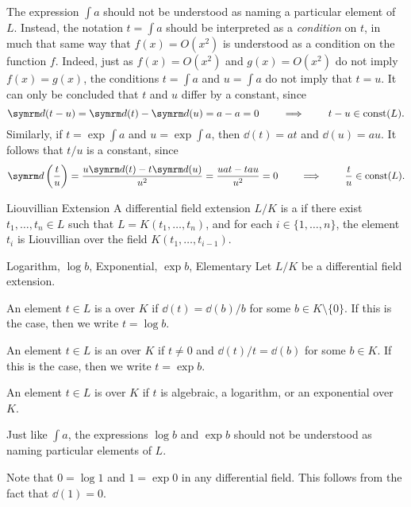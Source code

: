 The expression $\int a$ should not be understood as naming a particular element of $L$. Instead, the notation $t = \int a$ should be interpreted as a \textit{condition} on $t$, in much that same way that $f(x) = O(x^2)$ is understood as a condition on the function $f$. Indeed, just as $f(x) = O(x^2)$ and $g(x) = O(x^2)$ do not imply $f(x) = g(x)$, the conditions $t = \int a$ and $u = \int a$ do not imply that $t = u$. It can only be concluded that $t$ and $u$ differ by a constant, since
\[ \dd(t - u) = \dd(t) - \dd(u) = a - a = 0 \qquad\implies\qquad t - u \in \const(L). \]
Similarly, if $t = \exp \int a$ and $u = \exp \int a$, then $\dd(t) = at$ and $\dd(u) = au$. It follows that $t/u$ is a constant, since
\[ \dd\left( \frac{t}{u} \right) = \frac{u \dd(t) - t \dd(u)}{u^2} = \frac{uat - tau}{u^2} = 0 \qquad\implies\qquad \frac{t}{u} \in \const(L). \]

\begin{dfnbox}{Liouvillian Extension}
	A differential field extension $L/K$ is a  if there exist $t_1, \dots, t_n \in L$ such that $L = K(t_1, \dots, t_n)$, and for each $i \in \{1, \dots, n\}$, the element $t_i$ is Liouvillian over the field $K(t_1, \dots, t_{i-1})$.
\end{dfnbox}

\begin{dfnbox}{Logarithm, $\log b$, Exponential, $\exp b$, Elementary}
	Let $L/K$ be a differential field extension.
	\begin{dfnitems}
		\item An element $t \in L$ is a  over $K$ if $\dd(t) = \dd(b) / b$ for some $b \in K \setminus \{0\}$. If this is the case, then we write $t = \log b$.
		\item An element $t \in L$ is an  over $K$ if $t \ne 0$ and $\dd(t)/t = \dd(b)$ for some $b \in K$. If this is the case, then we write $t = \exp b$.
		\item An element $t \in L$ is  over $K$ if $t$ is algebraic, a logarithm, or an exponential over $K$.
	\end{dfnitems}
\end{dfnbox}

Just like $\int a$, the expressions $\log b$ and $\exp b$ should not be understood as naming particular elements of $L$.

Note that $0 = \log 1$ and $1 = \exp 0$ in any differential field. This follows from the fact that $\dd(1) = 0$.

